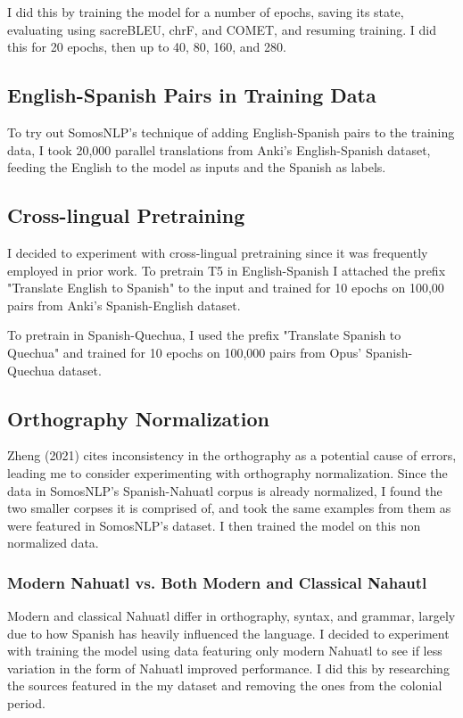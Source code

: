 \documentclass[10pt,twocolumn]{article}
\begin{document}
I did this by training the model for a number of epochs, saving its state, evaluating using sacreBLEU, chrF, and  COMET, and resuming training. I did this for 20 epochs, then up to 40, 80, 160, and 280.


\subsection{English-Spanish Pairs in Training Data}
To try out SomosNLP's technique of adding English-Spanish pairs to the training data, I took 20,000 parallel translations from Anki's English-Spanish dataset, feeding the English to the model as inputs and the Spanish as labels. 


\subsection{Cross-lingual Pretraining}
I decided to experiment with cross-lingual pretraining since it was frequently employed in  prior work. To pretrain T5 in English-Spanish I attached the prefix "Translate English to Spanish" to the input and trained for 10 epochs on 100,00 pairs from Anki's Spanish-English dataset. 

To pretrain in Spanish-Quechua, I used the prefix "Translate Spanish to Quechua" and trained for 10 epochs on 100,000 pairs from Opus' Spanish-Quechua dataset.

\subsection{Orthography Normalization}
Zheng (2021) cites inconsistency in the orthography as a potential cause of errors, leading me to consider experimenting with orthography normalization. Since the data in SomosNLP's Spanish-Nahuatl corpus is already normalized, I found the two smaller corpses it is comprised of, and took the same examples from them as were featured in SomosNLP's dataset. I then trained the model on this non normalized data. 

\subsubsection{Modern Nahuatl vs. Both Modern and Classical Nahautl}
Modern and classical Nahuatl differ in orthography, syntax, and grammar, largely due to how Spanish has heavily influenced the language. I decided to experiment with training the model using data featuring only modern Nahuatl to see if less variation in the form of Nahuatl improved performance. I did this by researching the sources featured in the my dataset and removing the ones from the colonial period.
\end{document}
